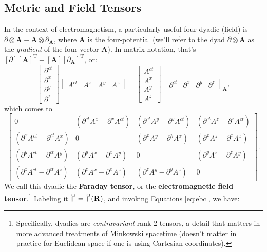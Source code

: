 \documentclass[12pt]{article}
\renewcommand{\vv}[1]{\mathbf{#1}}
\newcommand{\tightoverset}[2]{%
  \mathop{#2}\limits^{\vbox to -.5ex{\kern-0.75ex\hbox{$#1$}\vss}}}
\newcommand{\inlinedy}[1]{\tightoverset{\text{\tiny$\bm\leftrightarrow$}}{#1}}
\begin{document}
\subsection{Metric and Field Tensors}\label{sssec:mfd}

In the context of electromagnetism, a particularly useful four-dyadic (field) is $\partialup \otimes \vv A - \vv A \otimes \partialup_{\vv A}$, where $\vv A$ is the four-potential (we'll refer to the dyad $\partialup \otimes \vv A$ as the \emph{gradient} of the four-vector $\vv A$). In matrix notation, that's ${[\partialup][\vv A]^{\mathrm{T}} - [\vv A][\partialup_{\vv A}]^{\mathrm{T}}}$, or:
\begin{equation*}
\begin{bmatrix}
\partial^{ct} \\
\partial^x \\
\partial^y \\
\partial^z
\end{bmatrix}
\begin{bmatrix}
A^{ct} & A^x & A^y & A^z
\end{bmatrix}
-
\begin{bmatrix}
A^{ct} \\
A^x \\
A^y \\
A^z
\end{bmatrix}
\begin{bmatrix}
\partial^{ct} & \partial^x & \partial^y & \partial^z
\end{bmatrix}_{\vv A},
\end{equation*}
which comes to
\begin{equation*}
\begin{bmatrix}
0 & ( \partial^{ct} A^x - \partial^x A^{ct} ) & ( \partial^{ct} A^y - \partial^y A^{ct} ) & ( \partial^{ct} A^z - \partial^z A^{ct} ) \\[1.5ex]
( \partial^x A^{ct} - \partial^{ct} A^x ) & 0 & ( \partial^x A^y - \partial^y A^x ) & ( \partial^x A^z - \partial^z A^x ) \\[1.5ex]
( \partial^y A^{ct} - \partial^{ct} A^y ) & ( \partial^y A^x - \partial^x A^y ) & 0 & ( \partial^y A^z - \partial^z A^y ) \\[1.5ex]
( \partial^z A^{ct} - \partial^{ct} A^z ) & ( \partial^z A^x - \partial^x A^z ) & ( \partial^z A^y - \partial^y A^z ) & 0
\end{bmatrix} .
\end{equation*}
We call this dyadic the \textbf{Faraday tensor}, or the \textbf{electromagnetic field tensor}.\footnote{\label{fn:dy}Specifically, dyadics are \emph{contravariant} rank-2 tensors, a detail that matters in more advanced treatments of Minkowski spacetime (doesn't matter in practice for Euclidean space if one is using Cartesian coordinates).} Labeling it $\inlinedy{\mathsf{F}} = \inlinedy{\mathsf{F}} (\vv R)$, and invoking Equations \ref{eq:ebc}, we have:
\end{document}
